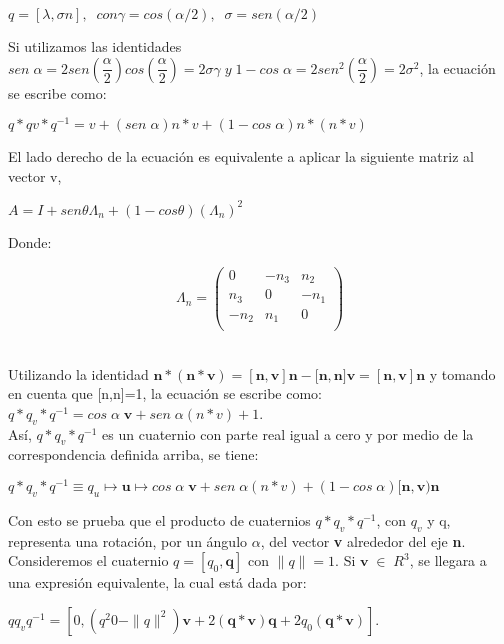 \documentclass[12pt,a4paper]{report}
\begin{document}
\begin{center}
$q=[\lambda,\sigma n],\;\; con\gamma=cos(\alpha/2),\;\; \sigma=sen(\alpha/2)$
\end{center}
Si utilizamos las identidades $sen\;\alpha=2sen(\dfrac{\alpha}{2})cos(\dfrac{\alpha}{2})=2\sigma\gamma\; y \; 1-cos\;\alpha=2sen^{2}(\dfrac{\alpha}{2})=2\sigma^{2}$, la ecuación se escribe como:\\
\begin{center}
$q*qv*q^{-1}=v+(sen\;\alpha)n*v+(1-cos\;\alpha)n*(n*v)$
\end{center}
El lado derecho de la ecuación es equivalente a aplicar la siguiente matriz al vector v,
\begin{center}
$A=I+sen\theta \Lambda_{n}+(1-cos\theta)(\Lambda_{n})^{2}$\end{center}
Donde:\begin{center}
\[\Lambda_{n}=\begin{pmatrix}
0 & -n_{3} & n_{2}\\
n_{3} & 0 & -n_{1}\\
-n_{2} & n_{1} & 0\\
\end{pmatrix}
\]\\
\end{center}
Utilizando la identidad $\textbf{n}*(\textbf{n}*\textbf{v})=[\textbf{n},\textbf{v}]\textbf{n}-[\textbf{n},\textbf{n]}\textbf{v}=[\textbf{n},\textbf{v}]\textbf{n}$ y tomando en cuenta que [n,n]=1, la ecuación se escribe como:
$q*q_{v}*q^{-1}=cos\;\alpha\;\textbf{v}+sen\;\alpha(n*v)+1$.\\
Así, $q*q_{v}*q^{-1}$ es un cuaternio con parte real igual a cero y por medio de la correspondencia definida arriba, se tiene:
\begin{center}
$q*q_{v}*q^{-1}\equiv q_{u}\mapsto\textbf{u}\mapsto cos\;\alpha\;\textbf{v}+sen\; \alpha(n*v)+(1-cos\;\alpha)[\textbf{n},\textbf{v})\textbf{n}$
\end{center}
Con esto se prueba que el producto de cuaternios $q*q_{v}*q^{-1}$, con $q_{v}$ y q, representa una rotación, por un ángulo $\alpha$, del vector \textbf{v} alrededor del eje \textbf{n}.\\
Consideremos el cuaternio $q=[q_{0},\textbf{q}]$ con $\parallel q\parallel=1$. Si $\textbf{v}\;\in\; R^{3}$, se llegara a una expresión equivalente, la cual está dada por:
\begin{center}
$qq_{v}q^{-1}=[0,(q^{2}0-\parallel q\parallel^{2})\textbf{v}+2(\textbf{q}*\textbf{v})\textbf{q}+2q_{0}(\textbf{q}*\textbf{v})]$.
\end{center}
\end{document}
